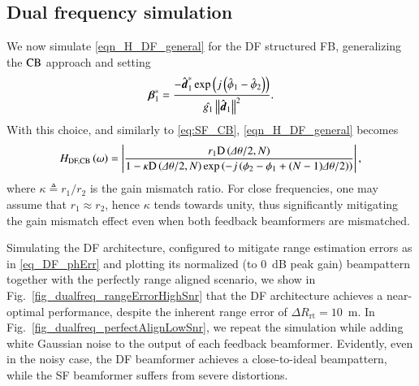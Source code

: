 \subsection{Dual frequency simulation}
We now simulate \eqref{eqn_H_DF_general} for the DF structured FB,
generalizing the $\text{CB}$ approach and setting
\begin{equation*}
    \boldsymbol{\beta}^{*}_{1}=\frac{-\hat{\boldsymbol{d}}^{\ast}_{1}\exp\left({j\left({\hat{\phi}_{1}-\hat{\phi}_{2}}\right)}\right)}{\hat{g_{1}}\left\Vert\hat{\boldsymbol{d}}_{1}\right\Vert^2}.
\end{equation*}
With this choice, and similarly to \eqref{eq:SF_CB}, \eqref{eqn_H_DF_general} becomes
\begin{equation}
    \label{eqn_H_DF_CB}
    {
        \begin{split}
            H_{\text{DF,\text{CB}}}\left({\omega}\right) =
            \left|{\frac{r_{1}\text{D}\left({\Delta\theta/2,N}\right)}{1-
            \kappa\text{D}\left({\Delta\theta/2,N}\right)\exp\left({-j\left({\phi_{2}-\phi_{1}+(N-1)\Delta\theta/2}\right)}\right)}
            }\right|,
        \end{split}
    }
\end{equation}
where $\kappa\triangleq{}r_{1}/r_{2}$ is the gain mismatch ratio.
For close frequencies, one may assume that $r_{1}\approx{}r_{2}$, hence $\kappa$ tends towards unity, thus significantly mitigating the gain mismatch effect even when both feedback beamformers are mismatched.
\par Simulating the DF architecture, configured to mitigate range estimation errors as in \eqref{eq_DF_phErr} and plotting its normalized (to $0$~dB peak gain) beampattern together with the perfectly range aligned scenario, we show in Fig.~\ref{fig_dualfreq_rangeErrorHighSnr} that the DF architecture achieves a near-optimal performance, despite the inherent range error of $\Delta{}R_{\text{rt}}=10$~m.
In Fig.~\ref{fig_dualfreq_perfectAlignLowSnr}, we repeat the simulation while adding white Gaussian noise to the output of each feedback beamformer. Evidently, even in the noisy case, the DF beamformer achieves a close-to-ideal beampattern, while the SF beamformer suffers from severe distortions.
